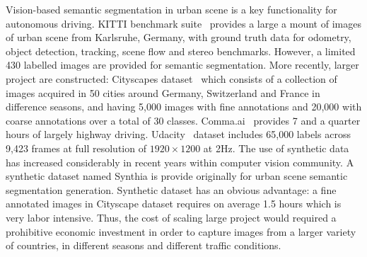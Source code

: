 \documentclass[10pt,twocolumn,letterpaper]{article}
\begin{document}
Vision-based semantic segmentation in urban scene is a key functionality for autonomous driving.
KITTI benchmark suite~\cite{Geiger2013IJRR} provides a large a mount of images of urban scene from Karlsruhe, Germany, with ground truth data for odometry, object detection, tracking, scene flow and stereo benchmarks. However, a limited 430 labelled images are provided for semantic segmentation.
More recently, larger project are constructed:
Cityscapes dataset~\cite{Cordts2016Cityscapes} which consists of a collection of images acquired in 50 cities around Germany, Switzerland and France in difference seasons, and having 5,000 images with fine annotations and 20,000 with coarse annotations over a total of 30 classes. Comma.ai~\cite{santana2016learning} provides 7 and a quarter hours of largely highway driving. Udacity~\cite{udacity} dataset includes 65,000 labels across 9,423 frames at full resolution of $1920\times1200$ at 2Hz.
The use of synthetic data has increased considerably in recent years within computer vision community. A synthetic dataset named Synthia is\cite{mueller2016benchmark} provide originally for urban scene semantic segmentation generation.
Synthetic dataset has an obvious advantage: a fine annotated images in Cityscape dataset requires on average 1.5 hours which is very labor intensive. Thus, the cost of scaling large project would required a prohibitive economic investment in order to capture images from a larger variety of countries, in different seasons and different traffic conditions.
\end{document}
